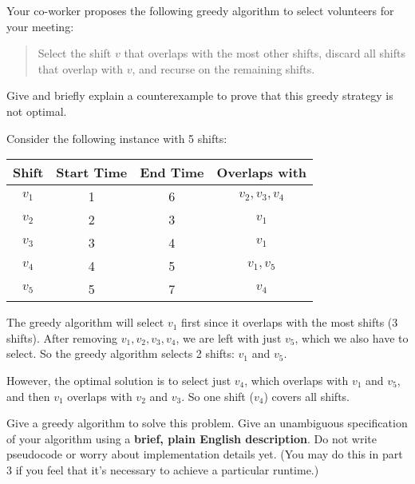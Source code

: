 \documentclass[11pt,fleqn]{exam}
\newenvironment{soln}{\color{solnblue}}{}
\newif\ifsolutions\solutionsfalse
\begin{document}
\begin{questions}
\question[2] Your co-worker proposes the following greedy algorithm to select volunteers for your meeting:
\begin{quote}
    Select the shift $v$ that overlaps with the most other shifts, discard all shifts that overlap with $v$, and recurse on the remaining shifts.
\end{quote}
Give and briefly explain a counterexample to prove that this greedy strategy is not optimal.

\begin{soln}
    Consider the following instance with 5 shifts:
    \begin{center}
        \begin{tabular}{|c|c|c|c|}
            \hline
            Shift & Start Time & End Time & Overlaps with \\
            \hline
            $v_1$ & 1 & 6 & $v_2, v_3, v_4$ \\
            $v_2$ & 2 & 3 & $v_1$ \\
            $v_3$ & 3 & 4 & $v_1$ \\
            $v_4$ & 4 & 5 & $v_1, v_5$ \\
            $v_5$ & 5 & 7 & $v_4$ \\
            \hline
        \end{tabular}
    \end{center}
    
    The greedy algorithm will select $v_1$ first since it overlaps with the most shifts (3 shifts). 
    After removing $v_1, v_2, v_3, v_4$, we are left with just $v_5$, which we also have to select.
    So the greedy algorithm selects 2 shifts: $v_1$ and $v_5$.
    
    However, the optimal solution is to select just $v_4$, which overlaps with $v_1$ and $v_5$, 
    and then $v_1$ overlaps with $v_2$ and $v_3$. So one shift ($v_4$) covers all shifts.
\end{soln}

\ifsolutions\fi 

\question[3] Give a greedy algorithm to solve this problem. Give an unambiguous specification of your algorithm using  a \textbf{brief, plain English description}. Do not write pseudocode or worry about implementation details yet. (You may do this in part 3 if you feel that it's necessary to achieve a particular runtime.)


\end{questions}
\end{document}
